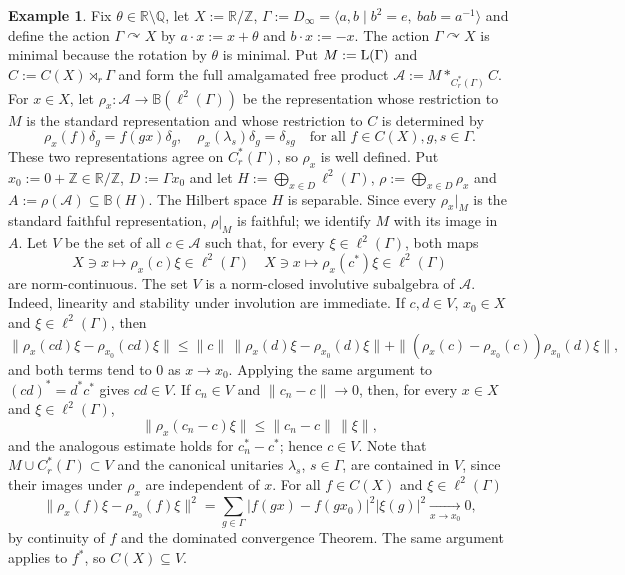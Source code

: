\documentclass[12pt]{amsart} %
\theoremstyle{plain}
\theoremstyle{definition}
\newtheorem{example}[theorem]{Example}
\newcommand{\Z}{\mathbb{Z}}
\newcommand{\LL}{{\rm L}}
\begin{document}
\begin{example}
\label{ex:minimal-discontinuous-centralizer-compact-range}
Fix $\theta\in\mathbb R\setminus\mathbb Q$, let $X:=\mathbb R/\mathbb Z$, $\Gamma:=D_\infty=\langle a,b\mid b^2=e,\ bab=a^{-1}\rangle$ and define the action $\Gamma\curvearrowright X$ by 
$a\cdot x:=x+\theta$ and $b\cdot x:=-x$. The action $\Gamma\curvearrowright X$ is minimal because the rotation by
$\theta$ is minimal. Put $M:=\LL(\Gamma)$ and $C:=C(X)\rtimes_r\Gamma$ and form the full amalgamated free product
$\mathcal A:=M*_{C_r^*(\Gamma)}C$. For $x\in X$, let $\rho_x:\mathcal A\to\mathbb B(\ell^2(\Gamma))$ be the
representation whose restriction to $M$ is the standard representation and
whose restriction to $C$ is determined by
$$
\rho_x(f)\delta_g=f(gx)\delta_g,
\quad
\rho_x(\lambda_s)\delta_g=\delta_{sg}\quad\text{for all }f\in C(X), g,s\in\Gamma.
$$
These two representations agree on $C_r^*(\Gamma)$, so $\rho_x$ is well
defined. Put $x_0:=0+\Z\in\mathbb R/\mathbb Z$, $D:=\Gamma x_0$ and let
$H:=\bigoplus_{x\in D}\ell^2(\Gamma)$, $\rho:=\bigoplus_{x\in D}\rho_x$ and $A:=\rho(\mathcal A)\subseteq\mathbb B(H)$. The Hilbert space $H$ is separable. Since every $\rho_x|_M$ is
the standard faithful representation, $\rho|_M$ is faithful; we identify
$M$ with its image in $A$.
\medskip
\noindent Let $V$ be the set of all $c\in\mathcal A$ such that, for every
$\xi\in\ell^2(\Gamma)$, both maps
$$
X\ni x\longmapsto\rho_x(c)\xi\in\ell^2(\Gamma)
\quad
X\ni x\longmapsto\rho_x(c^*)\xi\in\ell^2(\Gamma)
$$
are norm-continuous. The set $V$ is a norm-closed involutive subalgebra of $\mathcal A$. Indeed,
linearity and stability under involution are immediate. If $c,d\in V$,
$x_0\in X$ and $\xi\in\ell^2(\Gamma)$, then
$$
\|\rho_x(cd)\xi-\rho_{x_0}(cd)\xi\|
\leq \|c\|\,\|\rho_x(d)\xi-\rho_{x_0}(d)\xi\|+\|(\rho_x(c)-\rho_{x_0}(c))\rho_{x_0}(d)\xi\|,
$$
and both terms tend to $0$ as $x\to x_0$. Applying the same argument to
$(cd)^*=d^*c^*$ gives $cd\in V$. If $c_n\in V$ and $\|c_n-c\|\to0$,
then, for every $x\in X$ and $\xi\in\ell^2(\Gamma)$,
$$
\|\rho_x(c_n-c)\xi\|\leq\|c_n-c\|\,\|\xi\|,
$$
and the analogous estimate holds for $c_n^*-c^*$; hence $c\in V$.
\medskip
\noindent Note that $M\cup C^*_r(\Gamma)\subset V$ and the canonical unitaries $\lambda_s$, $s\in\Gamma$, are
contained in $V$, since their images under $\rho_x$ are independent of $x$. For all $f\in C(X)$ and $\xi\in \ell^2(\Gamma)$
$$
\|\rho_x(f)\xi-\rho_{x_0}(f)\xi\|^2
=\sum_{g\in\Gamma}
|f(gx)-f(gx_0)|^2|\xi(g)|^2
\underset{x\to x_0}{\longrightarrow}0,
$$
by continuity of $f$ and the dominated convergence Theorem. The same argument applies to $f^*$, so $C(X)\subseteq V$.

\end{example}
\end{document}
